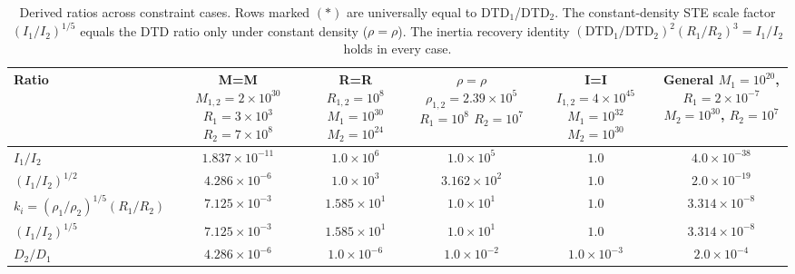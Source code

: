 \begin{table}[ht]
\centering
\caption{Derived ratios across constraint cases. Rows marked $(\ast)$ are universally equal to DTD$_1$/DTD$_2$. The constant-density STE scale factor $(I_1/I_2)^{1/5}$ equals the DTD ratio only under constant density ($\rho = \rho$). The inertia recovery identity $(\text{DTD}_1/\text{DTD}_2)^2(R_1/R_2)^3 = I_1/I_2$ holds in every case.}
\label{tab:pair_ratios}
\scriptsize
\begin{tabular}{@{} l c c c c c @{}}
\toprule
\textbf{Ratio} & \makecell{\textbf{M=M} \\ \scriptsize $M_{1,2}\!=\!2\!\times\!10^{30}$ \\ \scriptsize $R_1\!=\!3\!\times\!10^{3}$ \\ \scriptsize $R_2\!=\!7\!\times\!10^{8}$} & \makecell{\textbf{R=R} \\ \scriptsize $R_{1,2}\!=\!10^{8}$ \\ \scriptsize $M_1\!=\!10^{30}$ \\ \scriptsize $M_2\!=\!10^{24}$} & \makecell{\textbf{$\rho=\rho$} \\ \scriptsize $\rho_{1,2}\!=\!2.39\!\times\!10^{5}$ \\ \scriptsize $R_1\!=\!10^{8}$ \\ \scriptsize $R_2\!=\!10^{7}$} & \makecell{\textbf{I=I} \\ \scriptsize $I_{1,2}\!=\!4\!\times\!10^{45}$ \\ \scriptsize $M_1\!=\!10^{32}$ \\ \scriptsize $M_2\!=\!10^{30}$} & \makecell{\textbf{General} \\ \scriptsize $M_1\!=\!10^{20}$, $R_1\!=\!2\!\times\!10^{-7}$ \\ \scriptsize $M_2\!=\!10^{30}$, $R_2\!=\!10^{7}$} \\
\midrule
$I_1/I_2$ & $1.837 \times 10^{-11}$ & $1.0 \times 10^{6}$ & $1.0 \times 10^{5}$ & $1.0$ & $4.0 \times 10^{-38}$ \\
$(I_1/I_2)^{1/2}$ & $4.286 \times 10^{-6}$ & $1.0 \times 10^{3}$ & $3.162 \times 10^{2}$ & $1.0$ & $2.0 \times 10^{-19}$ \\
$k_i = (\rho_1/\rho_2)^{1/5}(R_1/R_2)$ & $7.125 \times 10^{-3}$ & $1.585 \times 10^{1}$ & $1.0 \times 10^{1}$ & $1.0$ & $3.314 \times 10^{-8}$ \\
$(I_1/I_2)^{1/5}$ & $7.125 \times 10^{-3}$ & $1.585 \times 10^{1}$ & $1.0 \times 10^{1}$ & $1.0$ & $3.314 \times 10^{-8}$ \\
$D_2/D_1$ & $4.286 \times 10^{-6}$ & $1.0 \times 10^{-6}$ & $1.0 \times 10^{-2}$ & $1.0 \times 10^{-3}$ & $2.0 \times 10^{-4}$ \\

\end{tabular}
\end{table}
